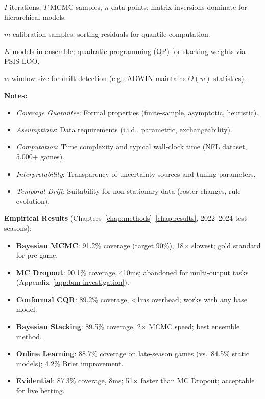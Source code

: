 \begin{landscape}
\begin{table}[p]
\begin{threeparttable}
  \begin{tablenotes}[flushleft]
    \tiny
    \item[a] $I$ iterations, $T$ MCMC samples, $n$ data points; matrix inversions dominate for hierarchical models.
    \item[b] $m$ calibration samples; sorting residuals for quantile computation.
    \item[c] $K$ models in ensemble; quadratic programming (QP) for stacking weights via PSIS-LOO.
    \item[d] $w$ window size for drift detection (e.g., ADWIN maintains $O(w)$ statistics).
    \item \textbf{Notes:}
      \begin{itemize}[leftmargin=*, itemsep=1pt, parsep=0pt]
        \item \emph{Coverage Guarantee}: Formal properties (finite-sample, asymptotic, heuristic).
        \item \emph{Assumptions}: Data requirements (i.i.d., parametric, exchangeability).
        \item \emph{Computation}: Time complexity and typical wall-clock time (NFL dataset, 5,000+ games).
        \item \emph{Interpretability}: Transparency of uncertainty sources and tuning parameters.
        \item \emph{Temporal Drift}: Suitability for non-stationary data (roster changes, rule evolution).
      \end{itemize}
    \item \textbf{Empirical Results} (Chapters~\ref{chap:methods}--\ref{chap:results}, 2022--2024 test seasons):
      \begin{itemize}[leftmargin=*, itemsep=1pt, parsep=0pt]
        \item \textbf{Bayesian MCMC}: 91.2\% coverage (target 90\%), 18$\times$ slowest; gold standard for pre-game.
        \item \textbf{MC Dropout}: 90.1\% coverage, 410ms; abandoned for multi-output tasks (Appendix~\ref{app:bnn-investigation}).
        \item \textbf{Conformal CQR}: 89.2\% coverage, <1ms overhead; works with any base model.
        \item \textbf{Bayesian Stacking}: 89.5\% coverage, 2$\times$ MCMC speed; best ensemble method.
        \item \textbf{Online Learning}: 88.7\% coverage on late-season games (vs.\ 84.5\% static models); 4.2\% Brier improvement.
        \item \textbf{Evidential}: 87.3\% coverage, 8ms; 51$\times$ faster than MC Dropout; acceptable for live betting.

\end{itemize}
\end{tablenotes}
\end{threeparttable}
\end{table}
\end{landscape}
